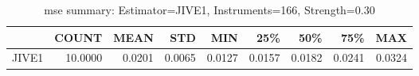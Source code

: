 \begin{table}[ht]
\centering
\caption{mse summary: Estimator=JIVE1, Instruments=166, Strength=0.30}
\begin{tabular}{lrrrrrrrr}
\toprule
 & COUNT & MEAN & STD & MIN & 25\% & 50\% & 75\% & MAX \\
\midrule
JIVE1 & 10.0000 & 0.0201 & 0.0065 & 0.0127 & 0.0157 & 0.0182 & 0.0241 & 0.0324 \\
\bottomrule
\end{tabular}
\end{table}
